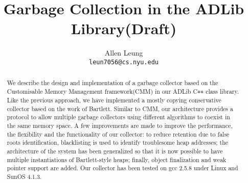 \def\ADLib{{\sf ADLib}}
\def\Prop{{\sf Prop}}
\def\CPP{C{\tt ++}}

   \title{Garbage Collection in the \ADLib{} Library(Draft)}
   \author{Allen Leung \\ {\tt leun7056@cs.nyu.edu}}

   \setlength{\textheight}{8.3in}
   \setlength{\textwidth}{6.5in}
   \setlength{\oddsidemargin}{-.10in}
   \setlength{\topmargin}{-.5in}


   \maketitle
   \begin{abstract} 
      We describe the design and implementation of a garbage collector
based on the Customisable Memory Management framework(CMM)\cite{CMM} in our
\ADLib{} \CPP{} class library.  Like the previous approach, we have 
implemented a mostly copying conservative collector based on the work
of Bartlett\cite{Mostly-copying}.  
 Similar to CMM, our architecture provides a protocol to allow 
multiple garbage collectors using different algorithms to coexist in the 
same memory space.  A few improvements are made to
improve the performance, the flexibility and the functionality of 
our collector: to reduce retention due to false roots identification,
blacklisting\cite{Boehm} is used to identify troublesome heap
addresses; the architecture of the system has been generalized so that it is 
now possible to have multiple instantiations of Bartlett-style heaps; 
finally, object finalization and weak pointer support
are added.  Our collector has been tested on gcc 2.5.8 under Linux 
and SunOS 4.1.3.
   \end{abstract}

   
